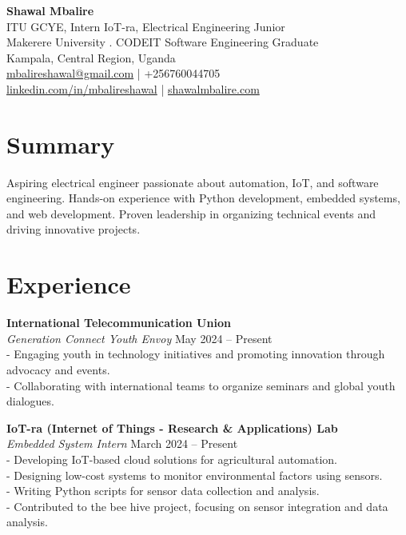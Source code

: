\documentclass[a4paper,10pt]{article}
\begin{document}
\parindent=0pt

\begin{center}
    {\LARGE \textbf{Shawal Mbalire}}\\
    ITU GCYE, Intern IoT-ra, Electrical Engineering Junior\\
    Makerere University . CODEIT Software Engineering Graduate\\
    Kampala, Central Region, Uganda\\
    \href{mailto:mbalireshawal@gmail.com}{mbalireshawal@gmail.com} | +256760044705\\
    \href{https://www.linkedin.com/in/mbalireshawal}{linkedin.com/in/mbalireshawal} | \href{https://shawalmbalire.com}{shawalmbalire.com}
\end{center}

\section*{Summary}
Aspiring electrical engineer passionate about automation, IoT, and software engineering. Hands-on experience with Python development, embedded systems, and web development. Proven leadership in organizing technical events and driving innovative projects.

\section*{Experience}
\textbf{International Telecommunication Union}\\
\textit{Generation Connect Youth Envoy} \hfill May 2024 -- Present\\
- Engaging youth in technology initiatives and promoting innovation through advocacy and events.\\
- Collaborating with international teams to organize seminars and global youth dialogues.

\textbf{IoT-ra (Internet of Things - Research \& Applications) Lab}\\
\textit{Embedded System Intern} \hfill March 2024 -- Present\\
- Developing IoT-based cloud solutions for agricultural automation.\\
- Designing low-cost systems to monitor environmental factors using sensors.\\
- Writing Python scripts for sensor data collection and analysis.\\
- Contributed to the bee hive project, focusing on sensor integration and data analysis.
\end{document}
